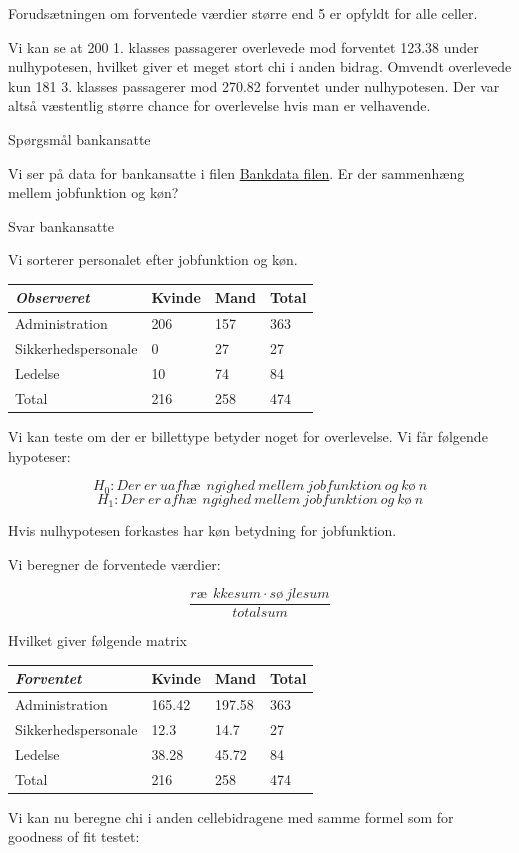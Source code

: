 \documentclass[]{book}
\begin{document}
Forudsætningen om forventede værdier større end 5 er opfyldt for alle celler.

Vi kan se at 200 1. klasses passagerer overlevede mod forventet 123.38 under nulhypotesen, hvilket giver et meget stort chi i anden bidrag. Omvendt overlevede kun 181 3. klasses passagerer mod 270.82 forventet under nulhypotesen. Der var altså væstentlig større chance for overlevelse hvis man er velhavende.

Spørgsmål bankansatte

Vi ser på data for bankansatte i filen \href{https://drive.google.com/uc?export=download\&id=0B1E7VnhxsDMlRENKWWxlNlBXbmM}{Bankdata filen}. Er der sammenhæng mellem jobfunktion og køn?

Svar bankansatte

Vi sorterer personalet efter jobfunktion og køn.

\begin{longtable}[]{@{}llll@{}}
\toprule
\textbf{\emph{Observeret}} & Kvinde & Mand & Total\tabularnewline
\midrule
\endhead
Administration & 206 & 157 & 363\tabularnewline
Sikkerhedspersonale & 0 & 27 & 27\tabularnewline
Ledelse & 10 & 74 & 84\tabularnewline
Total & 216 & 258 & 474\tabularnewline
\bottomrule
\end{longtable}

Vi kan teste om der er billettype betyder noget for overlevelse. Vi får følgende hypoteser:

\[H_0: Der\ er\ uafhæ\ \ ngighed\ mellem\ jobfunktion\ og\ kø\ n\]\[H_1: Der\ er\ afhæ\ \ ngighed\ mellem\ jobfunktion\ og\ kø\ n\]

Hvis nulhypotesen forkastes har køn betydning for jobfunktion.

Vi beregner de forventede værdier:

\[\frac{ræ\ \ kkesum\cdot sø\ jlesum}{totalsum}\]

Hvilket giver følgende matrix

\begin{longtable}[]{@{}llll@{}}
\toprule
\textbf{\emph{Forventet}} & Kvinde & Mand & Total\tabularnewline
\midrule
\endhead
Administration & 165.42 & 197.58 & 363\tabularnewline
Sikkerhedspersonale & 12.3 & 14.7 & 27\tabularnewline
Ledelse & 38.28 & 45.72 & 84\tabularnewline
Total & 216 & 258 & 474\tabularnewline
\bottomrule
\end{longtable}

Vi kan nu beregne chi i anden cellebidragene med samme formel som for goodness of fit testet:
\end{document}
